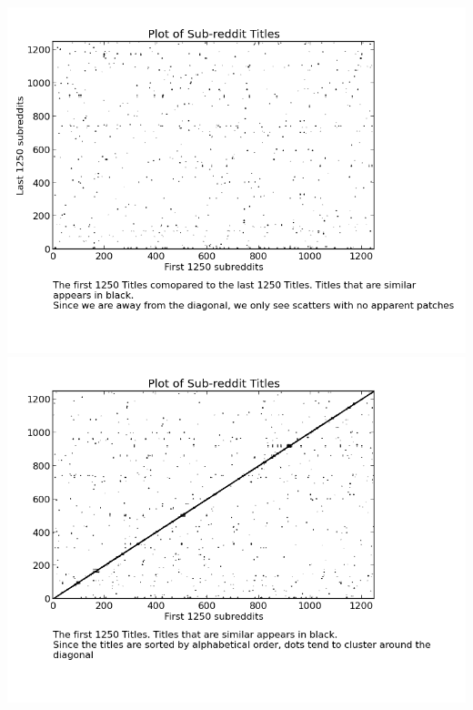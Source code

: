 \documentclass[10pt]{article}
\begin{document}
\includegraphics[scale=0.45]{Title12501.png} \includegraphics[scale=0.45]{Title1250.png}\\
\end{document}
